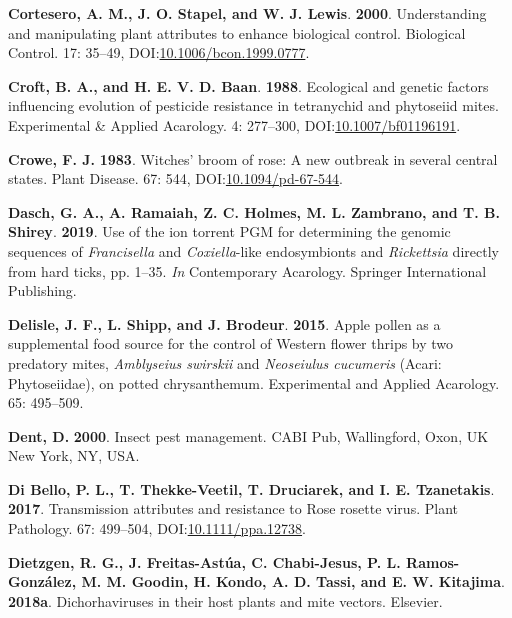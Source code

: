 \documentclass[12pt,final,CPage]{ufthesis}
\newlength{\cslhangindent}
\newenvironment{CSLReferences}[2] %
{%
	\setlength{\parindent}{0pt}
	\ifodd #1 \everypar{\setlength{\hangindent}{\cslhangindent}}\ignorespaces\fi
	\ifnum #2 > 0
	\setlength{\parskip}{#2\baselineskip}
	\fi
}%
{}
\begin{document}
{\begin{CSLReferences}{1}{0}
  \leavevmode{}%
  \textbf{Cortesero, A. M., J. O. Stapel, and W. J. Lewis}. \textbf{2000}. Understanding and manipulating plant attributes to enhance biological control. Biological Control. 17: 35--49, DOI:\href{https://doi.org/10.1006/bcon.1999.0777}{10.1006/bcon.1999.0777}.

  \leavevmode{}%
  \textbf{Croft, B. A., and H. E. V. D. Baan}. \textbf{1988}. Ecological and genetic factors influencing evolution of pesticide resistance in tetranychid and phytoseiid mites. Experimental {\&} Applied Acarology. 4: 277--300, DOI:\href{https://doi.org/10.1007/bf01196191}{10.1007/bf01196191}.

  \leavevmode{}%
  \textbf{Crowe, F. J.} \textbf{1983}. Witches' broom of rose: A new outbreak in several central states. Plant Disease. 67: 544, DOI:\href{https://doi.org/10.1094/pd-67-544}{10.1094/pd-67-544}.

  \leavevmode{}%
  \textbf{Dasch, G. A., A. Ramaiah, Z. C. Holmes, M. L. Zambrano, and T. B. Shirey}. \textbf{2019}. Use of the ion torrent {PGM} for determining the genomic sequences of {\emph{Francisella}} and {\emph{Coxiella}}-like endosymbionts and {\emph{Rickettsia}} directly from hard ticks, pp. 1--35. \emph{In} Contemporary Acarology. Springer International Publishing.

  \leavevmode{}%
  \textbf{Delisle, J. F., L. Shipp, and J. Brodeur}. \textbf{2015}. Apple pollen as a supplemental food source for the control of {Western flower thrips} by two predatory mites, {\emph{Amblyseius swirskii}} and {\emph{Neoseiulus cucumeris}} {({Acari}: {Phytoseiidae})}, on potted chrysanthemum. Experimental and Applied Acarology. 65: 495--509.

  \leavevmode{}%
  \textbf{Dent, D.} \textbf{2000}. Insect pest management. CABI Pub, Wallingford, Oxon, UK New York, NY, USA.

  \leavevmode{}%
  \textbf{Di Bello, P. L., T. Thekke-Veetil, T. Druciarek, and I. E. Tzanetakis}. \textbf{2017}. Transmission attributes and resistance to {Rose rosette virus}. Plant Pathology. 67: 499--504, DOI:\href{https://doi.org/10.1111/ppa.12738}{10.1111/ppa.12738}.

  \leavevmode{}%
  \textbf{Dietzgen, R. G., J. Freitas-Astúa, C. Chabi-Jesus, P. L. Ramos-González, M. M. Goodin, H. Kondo, A. D. Tassi, and E. W. Kitajima}. \textbf{2018a}. Dichorhaviruses in their host plants and mite vectors. Elsevier.


\end{CSLReferences}}
\end{document}
